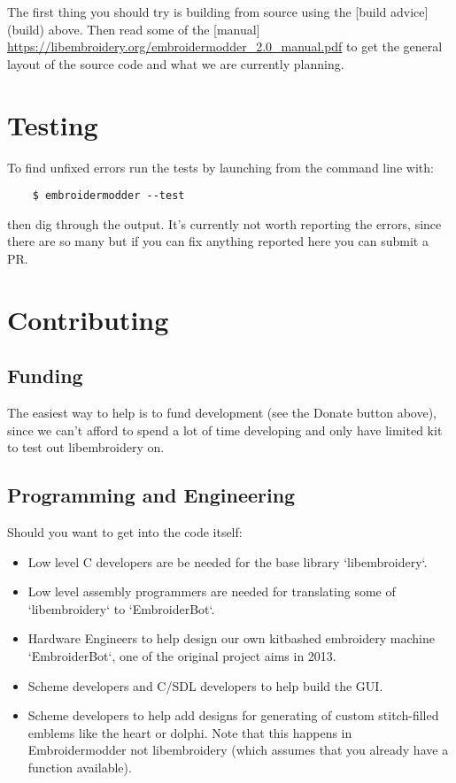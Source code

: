 The first thing you should try is building from source using the [build advice](build)
above. Then read some of the [manual] \url{https://libembroidery.org/embroidermodder_2.0_manual.pdf} to get the general
layout of the source code and what we are currently planning.

\section{Testing}

To find unfixed errors run the tests by launching from the command line with:

\begin{lstlisting}
    $ embroidermodder --test
\end{lstlisting}

then dig through the output. It's currently not worth reporting the errors, since
there are so many but if you can fix anything reported here you can submit a PR.

\section{Contributing}

\subsection{Funding}

The easiest way to help is to fund development (see the Donate button above),
since we can't afford to spend a lot of time developing and only have limited
kit to test out libembroidery on.

\subsection{Programming and Engineering}

Should you want to get into the code itself:

\begin{itemize}
\item Low level C developers are be needed for the base library `libembroidery`.
\item Low level assembly programmers are needed for translating some of `libembroidery` to `EmbroiderBot`.
\item Hardware Engineers to help design our own kitbashed embroidery machine `EmbroiderBot`, one of the original project aims in 2013.
\item Scheme developers and C/SDL developers to help build the GUI.
\item Scheme developers to help add designs for generating of custom stitch-filled emblems like the heart or dolphi. Note that this happens in Embroidermodder not libembroidery (which assumes that you already have a function available).
\end{itemize}

